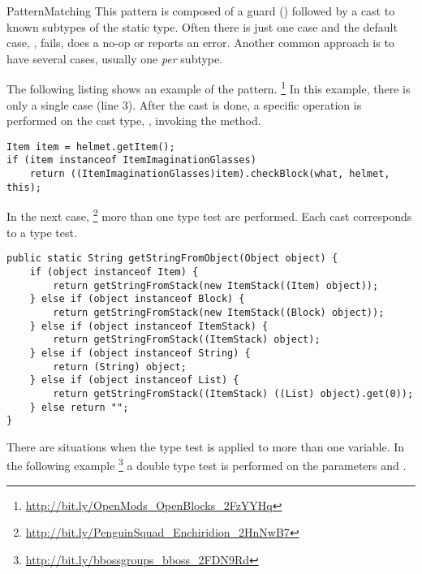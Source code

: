 \begin{pattern}{PatternMatching}
This pattern is composed of a guard () followed by a cast to known subtypes of the static type.
Often there is just one case and the default case, \ie,  fails, does a no-op or reports an error.
Another common approach is to have several cases,
usually one \emph{per} subtype.

\instances{}
The following listing shows an example of the \thisp{} pattern.%
\footnote{\url{http://bit.ly/OpenMods_OpenBlocks_2FzYYHq}}
%
%
In this example, there is only a single case (line 3).
After the cast is done, a specific operation is performed on the cast type,
\ie, invoking the  method.

\begin{verbatim}
Item item = helmet.getItem();
if (item instanceof ItemImaginationGlasses)
	return ((ItemImaginationGlasses)item).checkBlock(what, helmet, this);
\end{verbatim}

In the next case,%
\footnote{\url{http://bit.ly/PenguinSquad_Enchiridion_2HnNwB7}}
more than one type test are performed.
Each cast corresponds to a type test.

\begin{verbatim}
public static String getStringFromObject(Object object) {
	if (object instanceof Item) {
		return getStringFromStack(new ItemStack((Item) object));
	} else if (object instanceof Block) {
		return getStringFromStack(new ItemStack((Block) object));
	} else if (object instanceof ItemStack) {
		return getStringFromStack((ItemStack) object);
	} else if (object instanceof String) {
		return (String) object;
	} else if (object instanceof List) {
		return getStringFromStack((ItemStack) ((List) object).get(0));
	} else return "";
}
\end{verbatim}

There are situations when the type test is applied to more than one variable.
In the following example%
\footnote{\url{http://bit.ly/bbossgroups_bboss_2FDN9Rd}}
a double type test is performed on the parameters  and .


\end{pattern}
